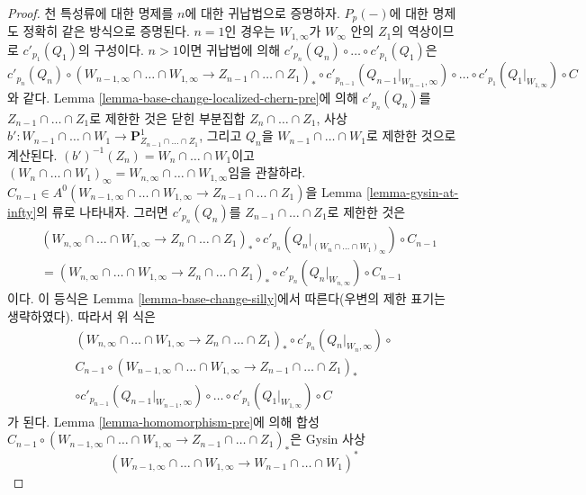 \begin{proof}
천 특성류에 대한 명제를 $n$에 대한 귀납법으로 증명하자. $P_p(-)$에
대한 명제도 정확히 같은 방식으로 증명된다. $n = 1$인 경우는
$W_{1, \infty}$가 $W_\infty$ 안의 $Z_1$의 역상이므로
$c'_{p_1}(Q_1)$의 구성이다. $n > 1$이면 귀납법에 의해
$c'_{p_n}(Q_n) \circ \ldots \circ c'_{p_1}(Q_1)$은
$$
c'_{p_n}(Q_n) \circ
(W_{n - 1, \infty} \cap \ldots \cap W_{1, \infty} \to
Z_{n - 1} \cap \ldots \cap Z_1)_* \circ
c'_{p_{n - 1}}(Q_{n - 1}|_{W_{n - 1}, \infty}) \circ \ldots \circ
c'_{p_1}(Q_1|_{W_{1, \infty}})
\circ C
$$
와 같다. Lemma \ref{lemma-base-change-localized-chern-pre}에 의해
$c'_{p_n}(Q_n)$를 $Z_{n - 1} \cap \ldots \cap Z_1$로 제한한 것은 닫힌
부분집합 $Z_n \cap \ldots \cap Z_1$, 사상
$b' : W_{n - 1} \cap \ldots \cap W_1 \to
\mathbf{P}^1_{Z_{n - 1} \cap \ldots \cap Z_1}$, 그리고 $Q_n$을
$W_{n - 1} \cap \ldots \cap W_1$로 제한한 것으로 계산된다.
$(b')^{-1}(Z_n) = W_n \cap \ldots \cap W_1$이고
$(W_n \cap \ldots \cap W_1)_\infty =
W_{n, \infty} \cap \ldots \cap W_{1, \infty}$임을 관찰하라.
$C_{n - 1} \in A^0(W_{n - 1, \infty} \cap \ldots \cap W_{1, \infty} \to
Z_{n - 1} \cap \ldots \cap Z_1)$을 Lemma
\ref{lemma-gysin-at-infty}의 류로 나타내자. 그러면
$c'_{p_n}(Q_n)$를 $Z_{n - 1} \cap \ldots \cap Z_1$로 제한한 것은
\begin{align*}
&
(W_{n, \infty} \cap \ldots \cap W_{1, \infty} \to Z_n \cap \ldots \cap Z_1)_*
\circ
c'_{p_n}(Q_n|_{(W_n \cap \ldots \cap W_1)_\infty})
\circ
C_{n - 1} \\
& =
(W_{n, \infty} \cap \ldots \cap W_{1, \infty} \to Z_n \cap \ldots \cap Z_1)_*
\circ
c'_{p_n}(Q_n|_{W_{n, \infty}})
\circ
C_{n - 1}
\end{align*}
이다. 이 등식은 Lemma \ref{lemma-base-change-silly}에서 따른다(우변의
제한 표기는 생략하였다). 따라서 위 식은
\begin{align*}
(W_{n, \infty} \cap \ldots \cap W_{1, \infty} \to
Z_n \cap \ldots \cap Z_1)_* \circ
c'_{p_n}(Q_n|_{W_n, \infty}) \circ \\
C_{n - 1} \circ
(W_{n - 1, \infty} \cap \ldots \cap W_{1, \infty} \to
Z_{n - 1} \cap \ldots \cap Z_1)_* \\
\circ
c'_{p_{n - 1}}(Q_{n - 1}|_{W_{n - 1}, \infty}) \circ \ldots \circ
c'_{p_1}(Q_1|_{W_{1, \infty}})
\circ C
\end{align*}
가 된다. Lemma \ref{lemma-homomorphism-pre}에 의해 합성
$C_{n - 1} \circ (W_{n - 1, \infty} \cap \ldots \cap W_{1, \infty} \to
Z_{n - 1} \cap \ldots \cap Z_1)_*$은 Gysin 사상
$$
(W_{n - 1, \infty} \cap \ldots \cap W_{1, \infty} \to
W_{n - 1} \cap \ldots \cap W_1)^*
$$
\end{proof}
